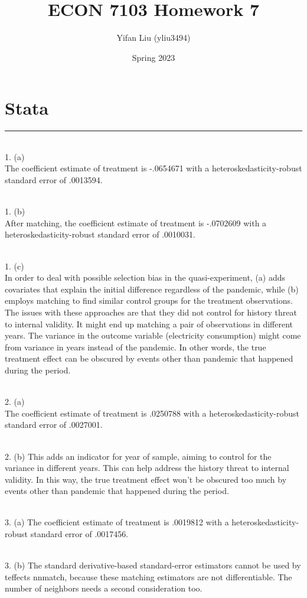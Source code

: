 \documentclass{article}
\title{ECON 7103 Homework 7}
\author{Yifan Liu (yliu3494)}
\date{Spring 2023}
\begin{document}
  
\maketitle


\noindent

\section{Stata}
\rule{17cm}{0.4pt}
\smallskip
\\ 1. (a)
\\ The coefficient estimate of treatment is -.0654671 with a heteroskedasticity-robust standard error of .0013594.

\noindent
\\ 1. (b)
\\ After matching, the coefficient estimate of treatment is -.0702609 with a heteroskedasticity-robust standard error of .0010031.

\noindent
\\ 1. (c)
\\ In order to deal with possible selection bias in the quasi-experiment, (a) adds covariates that explain the initial difference regardless of the pandemic, while (b) employs matching to find similar control groups for the treatment observations. 
\\ The issues with these approaches are that they did not control for history threat to internal validity. It might end up matching a pair of observations in different years. The variance in the outcome variable (electricity consumption) might come from variance in years instead of the pandemic. In other words, the true treatment effect can be obscured by events other than pandemic that happened during the period. 

\noindent
\\ 2. (a)
\\ The coefficient estimate of treatment is .0250788  with a heteroskedasticity-robust standard error of .0027001.

\noindent
\\ 2. (b)
This adds an indicator for year of sample, aiming to control for the variance in different years. This can help address the history threat to internal validity. In this way, the true treatment effect won't be obscured too much by events other than pandemic that happened during the period. 

\noindent
\\ 3. (a)
The coefficient estimate of treatment is .0019812  with a heteroskedasticity-robust standard error of .0017456. 

\noindent
\\ 3. (b)
The standard derivative-based standard-error estimators cannot be used by teffects nnmatch, because these matching estimators are not differentiable. The number of neighbors needs a second consideration too.
\end{document}

